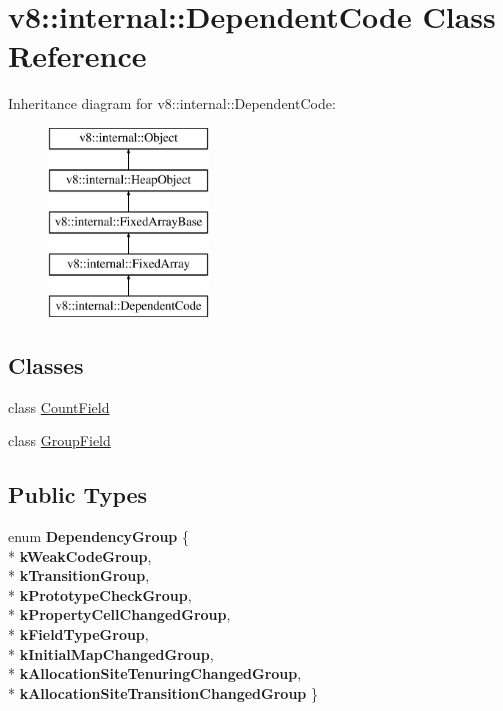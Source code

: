 \hypertarget{classv8_1_1internal_1_1_dependent_code}{}\section{v8\+:\+:internal\+:\+:Dependent\+Code Class Reference}
\label{classv8_1_1internal_1_1_dependent_code}
Inheritance diagram for v8\+:\+:internal\+:\+:Dependent\+Code\+:\begin{figure}[H]
\begin{center}
\leavevmode
\includegraphics[height=5.000000cm]{classv8_1_1internal_1_1_dependent_code}
\end{center}
\end{figure}
\subsection*{Classes}
\begin{DoxyCompactItemize}
\item 
class \hyperlink{classv8_1_1internal_1_1_dependent_code_1_1_count_field}{Count\+Field}
\item 
class \hyperlink{classv8_1_1internal_1_1_dependent_code_1_1_group_field}{Group\+Field}
\end{DoxyCompactItemize}
\subsection*{Public Types}
\begin{DoxyCompactItemize}
\item 
enum {\bfseries Dependency\+Group} \{ \\*
{\bfseries k\+Weak\+Code\+Group}, 
\\*
{\bfseries k\+Transition\+Group}, 
\\*
{\bfseries k\+Prototype\+Check\+Group}, 
\\*
{\bfseries k\+Property\+Cell\+Changed\+Group}, 
\\*
{\bfseries k\+Field\+Type\+Group}, 
\\*
{\bfseries k\+Initial\+Map\+Changed\+Group}, 
\\*
{\bfseries k\+Allocation\+Site\+Tenuring\+Changed\+Group}, 
\\*
{\bfseries k\+Allocation\+Site\+Transition\+Changed\+Group}
 \}\hypertarget{classv8_1_1internal_1_1_dependent_code_a6ddeb27b4e6f458ce2257036e3f364ae}{}\label{classv8_1_1internal_1_1_dependent_code_a6ddeb27b4e6f458ce2257036e3f364ae}

\end{DoxyCompactItemize}
